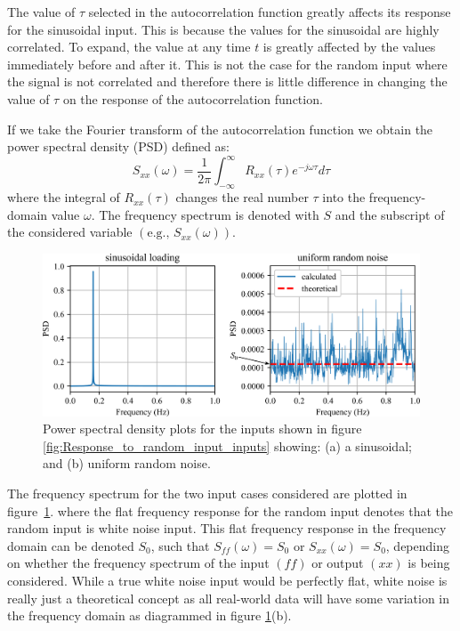 \documentclass[12pt,letter]{article}
\begin{document}
\begin{note}
 The value of $\tau$ selected in the autocorrelation function greatly affects its response for the sinusoidal input. This is because the values for the sinusoidal are highly correlated. To expand, the value at any time $t$ is greatly affected by the values immediately before and after it. This is not the case for the random input where the signal is not correlated and therefore there is little difference in changing the value of $\tau$ on the response of the autocorrelation function.  
\end{note}

If we take the Fourier transform of the autocorrelation function we obtain the power spectral density (PSD) defined as:
\begin{equation}
S_{xx}(\omega) =\frac{1}{2 \pi} \int_{-\infty}^{\infty} R_{xx}(\tau) e^{-j \omega \tau}d \tau
\end{equation}
where the integral of $R_{xx}(\tau)$ changes the real number $\tau$ into the frequency-domain value $\omega$. The frequency spectrum is denoted with $S$ and the subscript of the considered variable $(\text{e.g., }S_{xx}(\omega))$.  

\begin{figure}[H]
	\centering
	\includegraphics[width=6.5in]{../figures/Response_to_random_input_PSD}
	\caption{Power spectral density plots for the inputs shown in figure \ref{fig:Response_to_random_input_inputs} showing: (a) a sinusoidal; and (b) uniform random noise.}
	\label{fig:Response_to_random_input_PSD}
\end{figure}

The frequency spectrum for the two input cases considered are plotted in figure~\ref{fig:Response_to_random_input_PSD}. where the flat frequency response for the random input denotes that the random input is white noise input.  This flat frequency response in the frequency domain can be denoted $S_0$, such that $S_{ff}(\omega) = S_0$ or $S_{xx}(\omega) = S_0$, depending on whether the frequency spectrum of the input $(ff)$ or output  $(xx)$ is being considered. While a true white noise input would be perfectly flat, white noise is really just a theoretical concept as all real-world data will have some variation in the frequency domain as diagrammed in figure \ref{fig:Response_to_random_input_PSD}(b). 
\end{document}
